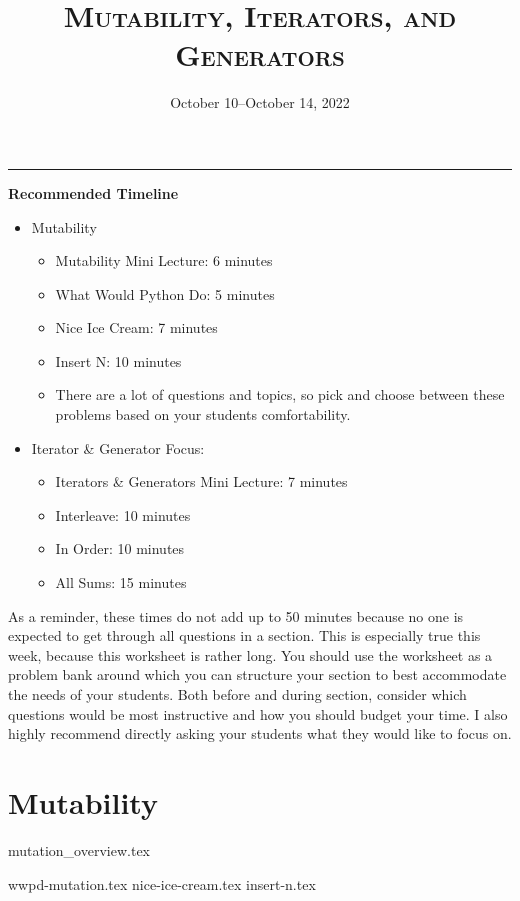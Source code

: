 \documentclass{exam}
\title{\textsc{Mutability, Iterators, and Generators}}
\date{October 10--October 14, 2022}
\begin{document}
\maketitle
\rule{\textwidth}{0.15em}
\fontsize{12}{15}\selectfont


\begin{guide}
    \textbf{Recommended Timeline}
    \begin{itemize}
        \item Mutability
        \begin{itemize}
            \item Mutability Mini Lecture: 6 minutes
            \item What Would Python Do: 5 minutes
            \item Nice Ice Cream: 7 minutes
            \item Insert N: 10 minutes
            \item There are a lot of questions and topics, so pick and choose between these problems based on your students comfortability.
        \end{itemize}
        \item Iterator \& Generator Focus:
        \begin{itemize}
            \item Iterators \& Generators Mini Lecture: 7 minutes
            \item Interleave: 10 minutes
            \item In Order: 10 minutes
            \item All Sums: 15 minutes
        \end{itemize}
    \end{itemize}

    As a reminder, these times do not add up to 50 minutes because no one is expected 
    to get through all questions in a section. This is especially true this week, 
    because this worksheet is rather long. You should use the worksheet as a problem bank
     around which you can structure your section to best accommodate the needs of your 
     students. Both before and during section, consider which questions would be most 
     instructive and how you should budget your time. I also highly recommend directly asking your students what they would like to focus on. 
\end{guide}

\section{Mutability}
	{mutation_overview.tex}
	\begin{questions}
		{wwpd-mutation.tex}
    {nice-ice-cream.tex}
    {insert-n.tex}
	\end{questions}
\end{document}
